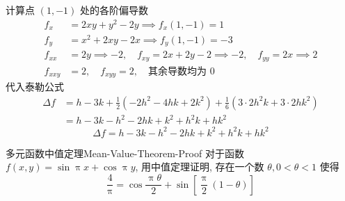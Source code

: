 \begin{solution}
    计算点 $(1, -1)$ 处的各阶偏导数
    \begin{equation}
        \begin{aligned}
            f_{x}   & = 2xy + y^2 - 2y \implies f_x(1, -1) = 1                                           \\
            f_{y}   & = x^2 + 2xy - 2x \implies f_y(1, -1) = -3                                          \\
            f_{xx}  & = 2y \implies -2, \quad f_{xy} = 2x+2y-2 \implies -2, \quad f_{yy} = 2x \implies 2 \\
            f_{xxy} & = 2, \quad f_{xyy} = 2, \quad \text{其余导数均为 } 0
        \end{aligned}
    \end{equation}
    代入泰勒公式
    \begin{equation}
        \begin{aligned}
            \Delta f & = h - 3k + \frac{1}{2}(-2h^2 - 4hk + 2k^2) + \frac{1}{6}(3 \cdot 2h^2k + 3 \cdot 2hk^2) \\
                     & = h - 3k - h^2 - 2hk + k^2 + h^2k + hk^2
        \end{aligned}
    \end{equation}
    \begin{equation}
        \boxed{\Delta f = h - 3k - h^2 - 2hk + k^2 + h^2k + hk^2}
    \end{equation}
\end{solution}


\begin{problem}{多元函数中值定理}{Mean-Value-Theorem-Proof}
    对于函数 $f(x, y) = \sin \uppi x + \cos \uppi y$, 用中值定理证明, 存在一个数 $\theta, 0 < \theta < 1$ 使得
    \begin{equation}
        \frac{4}{\uppi} = \cos \frac{\uppi \theta}{2} + \sin \left[ \frac{\uppi}{2}(1 - \theta) \right]
    \end{equation}
\end{problem}

